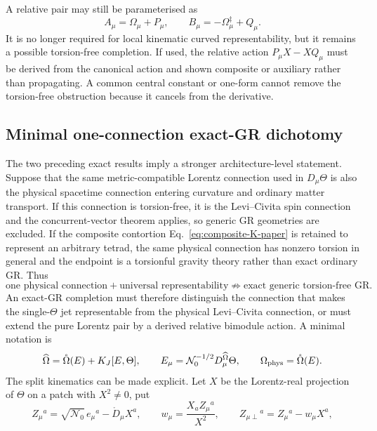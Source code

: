 \documentclass[12pt,a4paper]{article}
\theoremstyle{remark}\newtheorem{remark}[definition]{Remark}
\begin{document}
A relative pair may still be parameterised as
\begin{equation}
 A_\mu=\Omega_\mu+P_\mu,
 \qquad
 B_\mu=-\Omega_\mu^\ddagger+Q_\mu.
 \label{eq:relative-pair-paper}
\end{equation}
It is no longer required for local kinematic curved representability, but it
remains a possible torsion-free completion.  If used, the relative action
$P_\mu X-XQ_\mu$ must be derived from the canonical action and shown composite
or auxiliary rather than propagating.  A common central constant or one-form
cannot remove the torsion-free obstruction because it cancels from the
derivative.

\subsection{Minimal one-connection exact-GR dichotomy}
The two preceding exact results imply a stronger architecture-level statement.
Suppose that the same metric-compatible Lorentz connection used in
$D_\mu\Theta$ is also the physical spacetime connection entering curvature
and ordinary matter transport.  If this connection is torsion-free, it is the
Levi--Civita spin connection and the concurrent-vector theorem applies, so
generic GR geometries are excluded.  If the composite contortion
Eq.~\eqref{eq:composite-K-paper} is retained to represent an arbitrary tetrad,
the same physical connection has nonzero torsion in general and the endpoint is
a torsionful gravity theory rather than exact ordinary GR.  Thus
\begin{equation}
 \boxed{\text{one physical connection} + \text{universal representability}
 \not\Rightarrow \text{exact generic torsion-free GR}.}
 \label{eq:one-connection-no-go-paper}
\end{equation}
An exact-GR completion must therefore distinguish the connection that makes the
single-$\Theta$ jet representable from the physical Levi--Civita connection,
or must extend the pure Lorentz pair by a derived relative bimodule action.  A
minimal notation is
\begin{equation}
 \widehat\Omega=\mathring\Omega(E)+K_J[E,\Theta],
 \qquad
 E_\mu=\mathcal N_0^{-1/2}D_\mu^{\widehat\Omega}\Theta,
 \qquad
 \Omega_{\rm phys}=\mathring\Omega(E).
 \label{eq:jet-physical-split-paper}
\end{equation}
The split kinematics can be made explicit.  Let $X$ be the Lorentz-real
projection of $\Theta$ on a patch with $X^2\ne0$, put
\begin{equation}
 Z_\mu{}^a=\sqrt{\mathcal N_0}\,e_\mu{}^a-\mathring D_\mu X^a,
 \qquad
 w_\mu=\frac{X_aZ_\mu{}^a}{X^2},
 \qquad
 Z_{\mu\perp}{}^a=Z_\mu{}^a-w_\mu X^a,
\end{equation}
\end{document}
